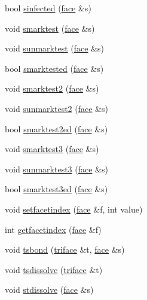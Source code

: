 \begin{DoxyCompactItemize}
\item 
bool \hyperlink{classtetgenmesh_a5ffe02962a36a2c20231991c2c1a1996}{sinfected} (\hyperlink{classtetgenmesh_1_1face}{face} \&s)
\item 
void \hyperlink{classtetgenmesh_aaa4ab339abe7e5806acb54f28d9ee915}{smarktest} (\hyperlink{classtetgenmesh_1_1face}{face} \&s)
\item 
void \hyperlink{classtetgenmesh_a95a2ff1dc65e9cf6fc45de667ecf1b48}{sunmarktest} (\hyperlink{classtetgenmesh_1_1face}{face} \&s)
\item 
bool \hyperlink{classtetgenmesh_abba717b23bb986de6fd9ba7caabbc57f}{smarktested} (\hyperlink{classtetgenmesh_1_1face}{face} \&s)
\item 
void \hyperlink{classtetgenmesh_a00988e7fce3b262e64921568b792f876}{smarktest2} (\hyperlink{classtetgenmesh_1_1face}{face} \&s)
\item 
void \hyperlink{classtetgenmesh_a9f9c756258b8714e8e699da3168f3243}{sunmarktest2} (\hyperlink{classtetgenmesh_1_1face}{face} \&s)
\item 
bool \hyperlink{classtetgenmesh_af0763e190de4c7e562a697ef70b07f49}{smarktest2ed} (\hyperlink{classtetgenmesh_1_1face}{face} \&s)
\item 
void \hyperlink{classtetgenmesh_a911624f2fd1f32f532ee7e6ac93e2f11}{smarktest3} (\hyperlink{classtetgenmesh_1_1face}{face} \&s)
\item 
void \hyperlink{classtetgenmesh_ad54453eed153d535778b54e16ec0e7a7}{sunmarktest3} (\hyperlink{classtetgenmesh_1_1face}{face} \&s)
\item 
bool \hyperlink{classtetgenmesh_ade28af838e064f4fc60716d8ca2402f6}{smarktest3ed} (\hyperlink{classtetgenmesh_1_1face}{face} \&s)
\item 
void \hyperlink{classtetgenmesh_ada5d50fbd8ccc1c82389b0b3450ce98e}{setfacetindex} (\hyperlink{classtetgenmesh_1_1face}{face} \&f, int value)
\item 
int \hyperlink{classtetgenmesh_ab4b3f98e52ac862ab3c619708c5bc07d}{getfacetindex} (\hyperlink{classtetgenmesh_1_1face}{face} \&f)
\item 
void \hyperlink{classtetgenmesh_aae16d3c2903a72e7f956d886499c2910}{tsbond} (\hyperlink{classtetgenmesh_1_1triface}{triface} \&t, \hyperlink{classtetgenmesh_1_1face}{face} \&s)
\item 
void \hyperlink{classtetgenmesh_a7bc17e79a3044819d9877b53d4153ac7}{tsdissolve} (\hyperlink{classtetgenmesh_1_1triface}{triface} \&t)
\item 
void \hyperlink{classtetgenmesh_aa43f0d641fd3b1585ef25c68f719e54a}{stdissolve} (\hyperlink{classtetgenmesh_1_1face}{face} \&s)

\end{DoxyCompactItemize}
